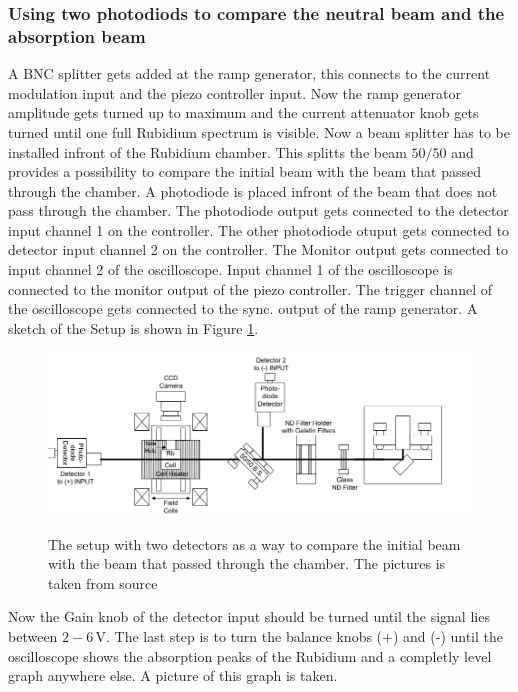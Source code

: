 \subsubsection{Using two photodiods to compare the neutral beam and the absorption beam}
\label{sec:absorptionsspectrum}
A BNC splitter gets added at the ramp generator, this connects to the current modulation input and the piezo controller input.
Now the ramp generator amplitude gets turned up to maximum and the current attenuator knob gets turned until one full Rubidium spectrum is visible.
Now a beam splitter has to be installed infront of the Rubidium chamber.
This splitts the beam $50/50$ and provides a possibility to compare the initial beam with the beam that passed through the chamber.
A photodiode is placed infront of the beam that does not pass through the chamber.
The photodiode output gets connected to the detector input channel 1 on the controller.
The other photodiode otuput gets connected to detector input channel 2 on the controller.
The Monitor output gets connected to input channel 2 of the oscilloscope.
Input channel 1 of the oscilloscope is connected to the monitor output of the piezo controller.
The trigger channel of the oscilloscope gets connected to the sync. output of the ramp generator.
A sketch of the Setup is shown in Figure \ref{fig:setup}.

\begin{figure}
    \centering
    \caption{The setup with two detectors as a way to compare the initial beam with the beam that passed through the chamber. The pictures is taken from source \cite[16]{anleitung_exp}}
    \includegraphics[width=\textwidth]{content/data/setup}
    \label{fig:setup}
\end{figure}

Now the Gain knob of the detector input should be turned until the signal lies between $2-6 \,\si{\volt}$.
The last step is to turn the balance knobs (+) and (-) until the oscilloscope shows the absorption peaks of the Rubidium and a completly level graph anywhere else.
A picture of this graph is taken.